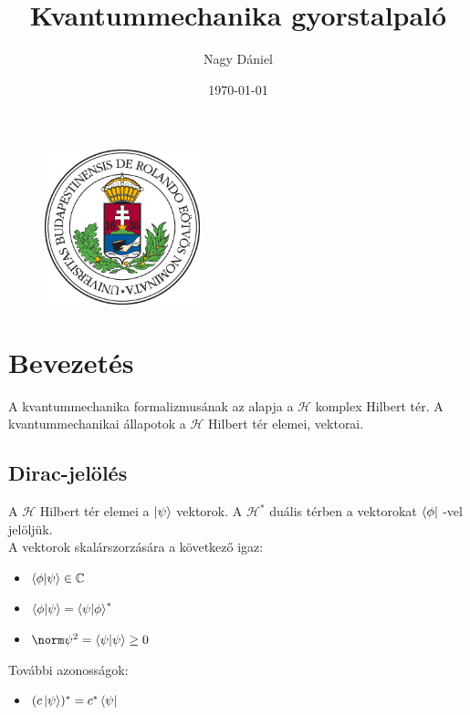 \newtheorem*{theorem*}{Tétel}
\newtheorem*{def*}{Definíció}
\newtheorem*{pld*}{Példa}
\newtheorem*{megj}{Megjegyzés}


\title{Kvantummechanika gyorstalpaló}
\author{Nagy Dániel}
\date{\today}

\maketitle
\vspace*{7.5cm}
\begin{figure}[h!]
    \begin{center}
    \includegraphics[width=0.4\textwidth]{./images/elte.eps}
    \end{center}
\end{figure}

\newpage


\section{Bevezetés}
A kvantummechanika formalizmusának az alapja a $\mathcal{H}$ komplex Hilbert tér. A kvantummechanikai állapotok a $\mathcal{H}$ Hilbert tér
elemei, vektorai.

\subsection{Dirac-jelölés}
A $\mathcal{H}$ Hilbert tér elemei a $\ket{\psi}$ vektorok. A $\mathcal{H}^{*}$ duális térben a vektorokat $\bra{\phi}$
-vel jelöljük.
\\ A vektorok skalárszorzására a következő igaz:
\begin{itemize}
    \item $\braket{\phi | \psi} \in \mathbb{C}$
    \item $\braket{\phi | \psi} = \braket{\psi|\phi}^{*}$
    \item $\norm\psi ^2 = \braket{\psi|\psi} \geq 0$
\end{itemize}
További azonosságok:
\begin{itemize}
    \item $(c\ket\psi)^{*} = c^* \bra\psi$
\end{itemize}


